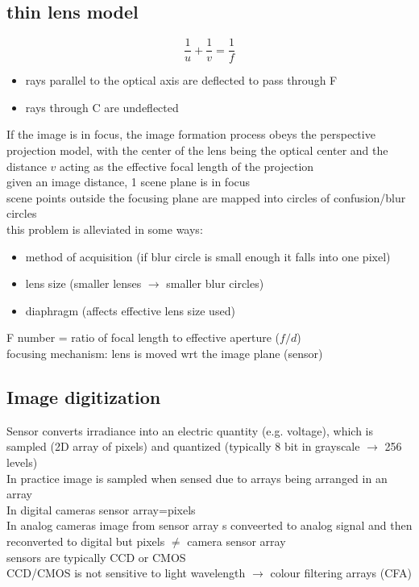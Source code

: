 \documentclass{article}
\begin{document}
\subsection{thin lens model}
\begin{equation}
	\frac{1}{u}+\frac{1}{v}=\frac{1}{f}
\end{equation}
\begin{itemize}
	\item rays parallel to the optical axis are deflected to pass through F
	\item rays through C are undeflected
\end{itemize}
If the image is in focus, the image formation process obeys the perspective projection model, with the center of the lens being the optical center and the distance $v$ acting as the effective focal length of the projection\\
given an image distance, 1 scene plane is in focus\\
scene points outside the focusing plane are mapped into circles of confusion/blur circles\\
this problem is alleviated in some ways: 
\begin{itemize}
	\item method of acquisition (if blur circle is small enough it falls into one pixel)
	\item lens size (smaller lenses $\rightarrow$ smaller blur circles)
	\item diaphragm (affects effective lens size used)
\end{itemize}
F number = ratio of focal length to effective aperture ($f/d$)\\
focusing mechanism: lens is moved wrt the image plane (sensor)

\subsection{Image digitization}
Sensor converts irradiance into an electric quantity (e.g. voltage), which is sampled (2D array of pixels) and quantized (typically 8 bit in grayscale $\rightarrow$ 256 levels)\\
In practice image is sampled when sensed due to arrays being arranged in an array\\
In digital cameras sensor array=pixels\\
In analog cameras image from sensor array s conveerted to analog signal and then reconverted to digital but pixels $\neq$ camera sensor array\\
sensors are typically CCD or CMOS\\
CCD/CMOS is not sensitive to light wavelength $\rightarrow$ colour filtering arrays (CFA)
\end{document}
